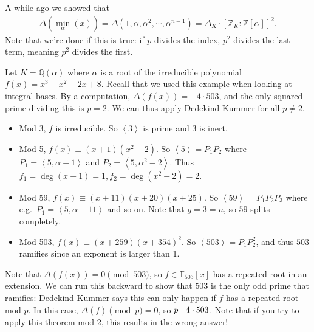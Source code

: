 \begin{remark}

A while ago we showed that
\begin{align*}
{\Delta}( \min_{ \alpha}(x)) = {\Delta}(1, \alpha, \alpha^2, \cdots , \alpha^{n-1}) = {\Delta}_K \cdot [{\mathbb{Z}}_K: {\mathbb{Z}}[ \alpha] ]^2
.\end{align*}
Note that we're done if this is true: if \(p\) divides the index,
\(p^2\) divides the last term, meaning \(p^2\) divides the first.

\end{remark}

\begin{example}[?]

Let \(K = {\mathbb{Q}}( \alpha)\) where \(\alpha\) is a root of the
irreducible polynomial \(f(x) = x^3 - x^2 - 2x + 8\). Recall that we
used this example when looking at integral bases. By a computation,
\({\Delta}(f(x)) = -4 \cdot 503\), and the only squared prime dividing
this is \(p=2\). We can thus apply Dedekind-Kummer for all \(p\neq 2\).

\begin{itemize}
\item
  Mod 3, \(f\) is irreducible. So \(\left\langle{ 3 }\right\rangle\) is
  prime and \(3\) is inert.
\item
  Mod 5, \(f(x) \equiv (x+1)(x^2 - 2)\). So
  \(\left\langle{ 5 }\right\rangle= P_1 P_2\) where
  \(P_1 = \left\langle{ 5, \alpha+ 1 }\right\rangle\) and
  \(P_2 = \left\langle{ 5, \alpha^2 - 2 }\right\rangle\). Thus
  \(f_1 = \deg(x+1) = 1, f_2 = \deg(x^2 - 2) = 2\).
\item
  Mod 59, \(f(x) \equiv (x+11)(x+20)(x+25)\). So
  \(\left\langle{ 59 }\right\rangle = P_1 P_2 P_3\) where
  e.g.~\(P_1 = \left\langle{ 5, \alpha+ 11 }\right\rangle\) and so on.
  Note that \(g=3=n\), so \(59\) splits completely.
\item
  Mod 503, \(f(x) \equiv (x+259)(x+354)^2\). So
  \(\left\langle{ 503 }\right\rangle= P_1 P_2^2\), and thus \(503\)
  ramifies since an exponent is larger than 1.
\end{itemize}

Note that \({\Delta}(f(x)) = 0 \pmod 503\), so
\(f\in {\mathbb{F}}_{503}[x]\) has a repeated root in an extension. We
can run this backward to show that \(503\) is the only odd prime that
ramifies: Dedekind-Kummer says this can only happen if \(f\) has a
repeated root mod \(p\). In this case, \({\Delta}(f) \pmod p = 0\), so
\(p\bigm|4\cdot 503\). Note that if you try to apply this theorem mod 2,
this results in the wrong answer!

\end{example}

